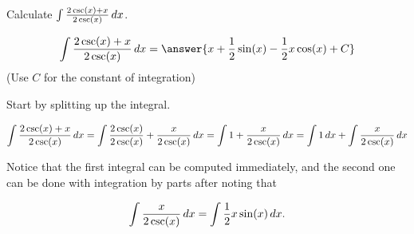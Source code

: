 \documentclass{ximera}
\author{Jim Talamo}
\begin{document}
\begin{exercise}
Calculate $\int \frac{2 \csc(x)+x}{2\csc(x)} \mathop{}\!d x $.


\[
\int \frac{2 \csc(x)+x}{2\csc(x)} \d x  = \answer{x+\frac{1}{2} \sin(x)-\frac{1}{2} x \cos(x)+ C } 
\]
(Use $C$ for the constant of integration)

\begin{hint}
Start by splitting up the integral.

\[
\int \frac{2 \csc(x)+x}{2\csc(x)} \mathop{}\!d x = \int \frac{2 \csc(x)}{2\csc(x)}+\frac{x}{2\csc(x)} \mathop{}\!d x =\int 1 +\frac{x}{2\csc(x)} \mathop{}\!d x  = \int 1 \mathop{}\!d x +\int \frac{x}{2\csc(x)} \mathop{}\!d x\]

Notice that the first integral can be computed immediately, and the second one can be done with integration by parts after noting that

\[
\int \frac{x}{2\csc(x)} \mathop{}\!d x = \int \frac{1}{2}x\sin(x) \mathop{}\!d x.
\]
\end{hint}

\end{exercise}
\end{document}
